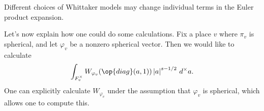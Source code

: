 \documentclass[../notes.tex]{subfiles}
\begin{document}
\begin{remark}
	Different choices of Whittaker models may change individual terms in the Euler product expansion.
\end{remark}
Let's now explain how one could do some calculations. Fix a place $v$ where $\pi_v$ is spherical, and let $\varphi_v$ be a nonzero spherical vector. Then we would like to calculate
\[\int_{F_v^\times}W_{\varphi_v}(\op{diag}(a,1))\left|a\right|^{s-1/2}\,d^\times a.\]
One can explicitly calculate $W_{\varphi_v}$ under the assumption that $\varphi_v$ is spherical, which allows one to compute this.
\end{document}
